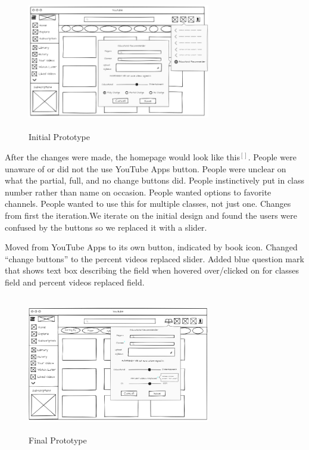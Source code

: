 \documentclass[letterpaper]{article} %
\begin{document}
\begin{figure}[h]     
	\centering
    \includegraphics[width=8cm, height=6cm]{prototype0.PNG}
    \caption{Initial Prototype}
    \label{fig:prototype0}
\end{figure}

 After the changes were made, the homepage would look like this$^[]$. People were unaware of or did not the use YouTube Apps button. People were unclear on what the partial, full, and no change buttons did. People instinctively put in class number rather than name on occasion. People wanted options to favorite channels. People wanted to use this for multiple classes, not just one. Changes from first the iteration.We iterate on the initial design and found the users were confused by the buttons so we replaced it with a slider. 

Moved from YouTube Apps to its own button, indicated by book icon. Changed “change buttons” to the percent videos replaced slider. Added blue question mark that shows text box describing the field when hovered over/clicked on for classes field and percent videos replaced field.

\begin{figure}[h]
    \centering
    \includegraphics[width=8cm, height=6cm]{prototype.PNG}
    \caption{Final Prototype}
    \label{fig:prototype}
\end{figure}
\end{document}

